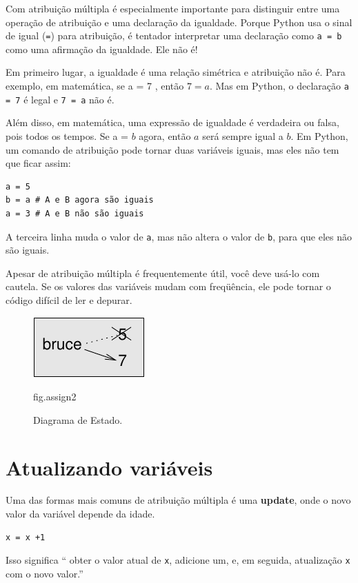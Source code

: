 \documentclass[10pt]{book}
\begin{document}
{{Com atribuição múltipla é especialmente importante para distinguir
entre uma operação de atribuição e uma declaração da igualdade. Porque
Python usa o sinal de igual ({\tt =}) para atribuição, é tentador
interpretar uma declaração como {\tt a = b} como uma afirmação da igualdade. Ele
não é!

Em primeiro lugar, a igualdade é uma relação simétrica e atribuição não é. Para
exemplo, em matemática, se a = 7 $ $, então $ 7 = a $. Mas em Python, o
declaração {\tt a = 7} é legal e {\tt 7 = a} não é.

Além disso, em matemática, uma expressão de igualdade é verdadeira ou
falsa, pois todos os tempos. Se a = $ b $ agora, então $ a $ será sempre igual a $ b $.
Em Python, um comando de atribuição pode tornar duas variáveis ​​iguais, mas
eles não tem que ficar assim:

\begin{verbatim}
a = 5
b = a # A e B agora são iguais
a = 3 # A e B não são iguais
\end{verbatim}
%
A terceira linha muda o valor de {\tt a}, mas não altera o
valor de {\tt b}, para que eles não são iguais. 

Apesar de atribuição múltipla é frequentemente útil, você deve usá-lo
com cautela. Se os valores das variáveis ​​mudam com freqüência, ele pode
tornar o código difícil de ler e depurar.

\begin{figure}
\centerline
{\includegraphics[scale = 0.8] {figs/assign2.pdf}}
\caption{Diagrama de Estado.}
\label{} fig.assign2
\end{figure}



\section{Atualizando variáveis}
\label{update}


Uma das formas mais comuns de atribuição múltipla é uma {\bf update},
onde o novo valor da variável depende da idade.

\begin{verbatim}
x = x +1
\end{verbatim}
%
Isso significa `` obter o valor atual de {\tt x}, adicione um, e, em seguida,
atualização {\tt x} com o novo valor.''

}}
\end{document}
